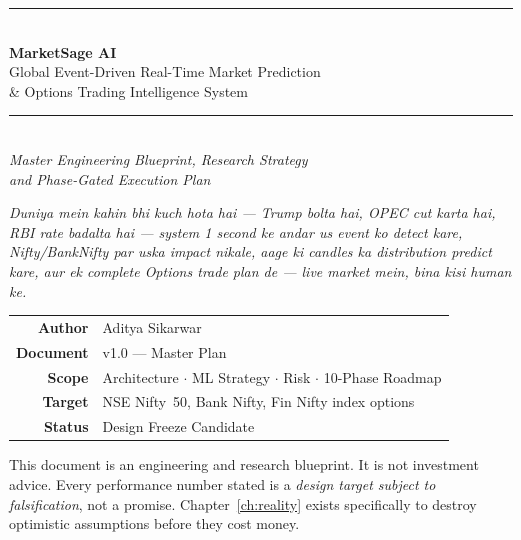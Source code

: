 



\begin{titlepage}
\centering
\vspace*{1.2cm}
{\color{msblue}\rule{\textwidth}{2pt}}\\[6pt]
{\Huge\bfseries\color{msblue} MarketSage AI}\\[10pt]
{\LARGE Global Event-Driven Real-Time Market Prediction\\[4pt] \& Options Trading Intelligence System}\\[8pt]
{\color{msblue}\rule{\textwidth}{2pt}}\\[18pt]

{\large\itshape Master Engineering Blueprint, Research Strategy \\ and Phase-Gated Execution Plan}\\[24pt]

\begin{tcolorbox}[width=0.94\textwidth,colback=mslight,colframe=msblue,
                  boxrule=0.8pt,arc=3pt]
\centering\itshape\large
Duniya mein kahin bhi kuch hota hai --- Trump bolta hai, OPEC cut karta hai,
RBI rate badalta hai --- system 1 second ke andar us event ko detect kare,
Nifty/BankNifty par uska impact nikale, aage ki candles ka
\emph{distribution} predict kare, aur ek complete Options trade plan
de --- live market mein, bina kisi human ke.
\end{tcolorbox}

\vspace{20pt}
\begin{tabular}{@{}rl@{}}
\textbf{Author}   & Aditya Sikarwar \\
\textbf{Document} & v1.0 --- Master Plan \\
\textbf{Scope}    & Architecture $\cdot$ ML Strategy $\cdot$ Risk $\cdot$ 10-Phase Roadmap \\
\textbf{Target}   & NSE Nifty~50, Bank Nifty, Fin Nifty index options \\
\textbf{Status}   & Design Freeze Candidate \\
\end{tabular}

\vfill
{\footnotesize\color{msgrey}
This document is an engineering and research blueprint. It is not investment
advice. Every performance number stated is a \emph{design target subject to
falsification}, not a promise. Chapter~\ref{ch:reality} exists specifically to
destroy optimistic assumptions before they cost money.}
\end{titlepage}

